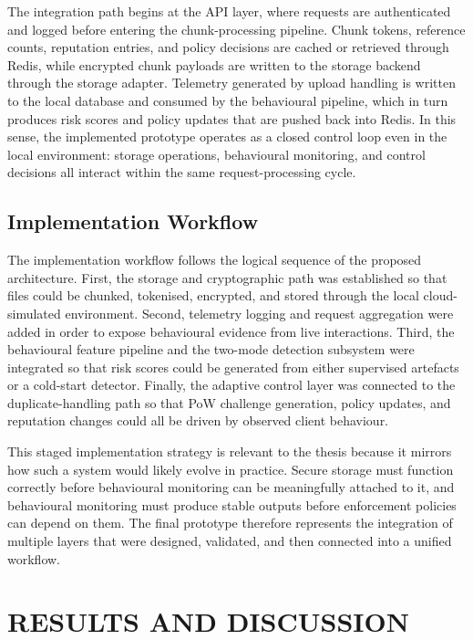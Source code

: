 \documentclass[12pt,a4paper,oneside]{report}
\begin{document}
The integration path begins at the API layer, where requests are authenticated and logged before entering the chunk-processing pipeline. Chunk tokens, reference counts, reputation entries, and policy decisions are cached or retrieved through Redis, while encrypted chunk payloads are written to the storage backend through the storage adapter. Telemetry generated by upload handling is written to the local database and consumed by the behavioural pipeline, which in turn produces risk scores and policy updates that are pushed back into Redis. In this sense, the implemented prototype operates as a closed control loop even in the local environment: storage operations, behavioural monitoring, and control decisions all interact within the same request-processing cycle.

\section{Implementation Workflow}

The implementation workflow follows the logical sequence of the proposed architecture.
First, the storage and cryptographic path was established so that files could be chunked, tokenised, encrypted, and stored through the local cloud-simulated environment.
Second, telemetry logging and request aggregation were added in order to expose behavioural evidence from live interactions.
Third, the behavioural feature pipeline and the two-mode detection subsystem were integrated so that risk scores could be generated from either supervised artefacts or a cold-start detector.
Finally, the adaptive control layer was connected to the duplicate-handling path so that PoW challenge generation, policy updates, and reputation changes could all be driven by observed client behaviour.

This staged implementation strategy is relevant to the thesis because it mirrors how such a system would likely evolve in practice.
Secure storage must function correctly before behavioural monitoring can be meaningfully attached to it, and behavioural monitoring must produce stable outputs before enforcement policies can depend on them.
The final prototype therefore represents the integration of multiple layers that were designed, validated, and then connected into a unified workflow.

\chapter{RESULTS AND DISCUSSION}
\end{document}
